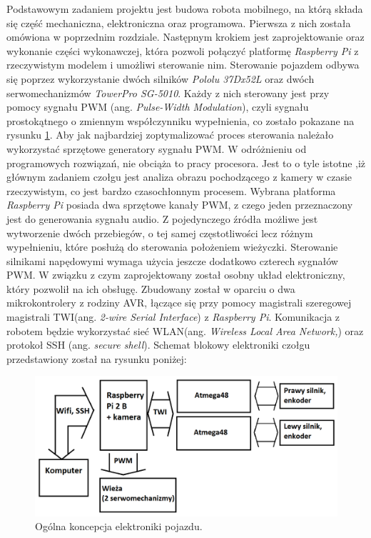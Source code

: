 Podstawowym zadaniem projektu jest budowa robota mobilnego, na którą składa się część mechaniczna, elektroniczna oraz programowa. Pierwsza z nich została omówiona w poprzednim rozdziale. Następnym krokiem jest zaprojektowanie oraz wykonanie części wykonawczej, która pozwoli połączyć platformę \textit{Raspberry Pi} z rzeczywistym modelem i umożliwi sterowanie nim. 
Sterowanie pojazdem odbywa się poprzez wykorzystanie dwóch silników \textit{Pololu 37Dx52L} oraz dwóch serwomechanizmów \textit{TowerPro SG-5010}. Każdy z nich sterowany jest przy pomocy sygnału PWM (ang. \textit{Pulse-Width Modulation}), czyli sygnału prostokątnego o zmiennym współczynniku wypełnienia, co zostało pokazane na rysunku \ref{sygnal_PWM}. Aby jak najbardziej zoptymalizować proces sterowania należało wykorzystać sprzętowe generatory sygnału PWM. W odróżnieniu od programowych rozwiązań, nie obciąża to pracy procesora. Jest to o tyle istotne ,iż głównym zadaniem czołgu jest analiza obrazu pochodzącego z kamery w czasie rzeczywistym, co jest bardzo czasochłonnym procesem. Wybrana platforma \textit{Raspberry Pi} posiada dwa sprzętowe kanały PWM, z czego jeden przeznaczony jest do generowania sygnału audio. Z pojedynczego źródła możliwe jest wytworzenie dwóch przebiegów, o tej samej częstotliwości lecz różnym wypełnieniu, które posłużą do sterowania położeniem wieżyczki. Sterowanie silnikami napędowymi wymaga użycia jeszcze dodatkowo czterech sygnałów PWM. W związku z czym zaprojektowany został osobny układ elektroniczny, który pozwolił na ich obsługę. Zbudowany został w oparciu o dwa mikrokontrolery z rodziny AVR, łączące się przy pomocy magistrali szeregowej magistrali TWI(ang. \textit{2-wire Serial Interface}) z \textit{Raspberry Pi}. Komunikacja z robotem będzie wykorzystać sieć WLAN(ang. \textit{Wireless Local Area Network,}) oraz protokoł SSH (ang. \textit{secure shell}). Schemat blokowy elektroniki czołgu przedstawiony został na rysunku poniżej:

  \begin{figure}[H]
    \begin{center}
      \includegraphics[scale=0.35]{imgs/idea.png}
 	\caption[Koncepcja elektroniki.]{\small{Ogólna koncepcja elektroniki pojazdu.}}
	\label{sygnal_PWM}
    \end{center}
  \end{figure}  
  

